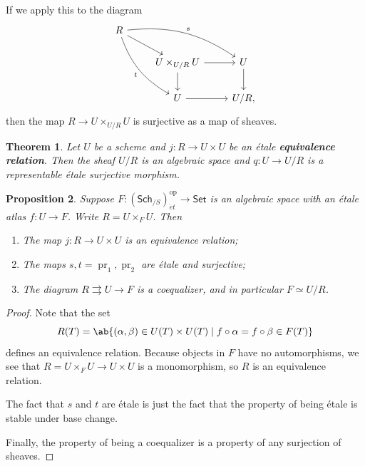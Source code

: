 \documentclass{amsart}
\newtheorem{thm}{Theorem}[section]
\newtheorem{prop}[thm]{Proposition}
\theoremstyle{definition}
\theoremstyle{remark}
\theoremstyle{plain}
\theoremstyle{definition}
\theoremstyle{remark}
\newcommand{\on}[1]{\operatorname{#1}}
\newcommand{\ms}[1]{\mathsf{#1}}
\newcommand{\1}{\mathbf{1}}
\newcommand{\2}{\mathbf{2}}
\newcommand{\3}{\mathbf{3}}
\begin{document}
If we apply this to the diagram
\begin{equation*}
\begin{tikzcd}
    R \ar[bend left=20]{drr}{s} \ar{dr} \ar[bend right=20]{ddr}[swap]{t} \\
    & U \times_{U/R} U \ar{r} \ar{d} & U \ar{d} \\
    & U \ar{r} & U/R,
\end{tikzcd}
\end{equation*}
then the map \(R \to U \times_{U/R} U\) is surjective as a map of sheaves.

\begin{thm}\label{thm:quotient-by-etale-equivalence-relation}
    Let \(U\) be a scheme and \(j \colon R \to U \times U\) be an \'etale \textbf{equivalence relation}. Then the sheaf \(U/R\) is an algebraic space and \(q \colon U \to U /R\) is a representable \'etale surjective morphism.
\end{thm}

\begin{prop}
    Suppose \(F \colon (\ms{Sch}_{/S})_{\acute{e}t}^{\on{op}} \to \ms{Set}\) is an algebraic space with an \'etale atlas \(f \colon U \to F\). Write \(R = U \times_F U\). Then
    \begin{enumerate}
        \item The map \(j \colon R \to U \times U\) is an equivalence relation;
        \item The maps \(s,t = \on{pr}_1, \on{pr}_2\) are \'etale and surjective;
        \item The diagram \(R \rightrightarrows U \to F\) is a coequalizer, and in particular \(F \simeq U/R\).
    \end{enumerate}
\end{prop}

\begin{proof}
    Note that the set
    \[ R(T) = \ab\{ (\alpha, \beta) \in U(T) \times U(T) \mid f \circ \alpha = f \circ \beta \in F(T) \} \]
    defines an equivalence relation. Because objects in \(F\) have no automorphisms, we see that \(R = U \times_F U \to U \times U\) is a monomorphism, so \(R\) is an equivalence relation.

    The fact that \(s\) and \(t\) are \'etale is just the fact that the property of being \'etale is stable under base change.

    Finally, the property of being a coequalizer is a property of any surjection of sheaves.
\end{proof}
\end{document}
